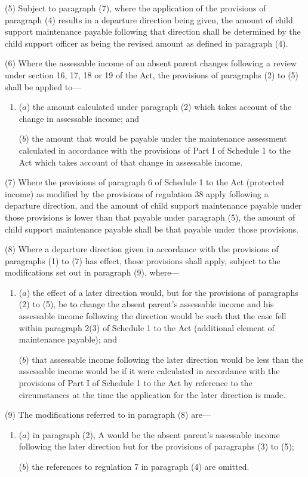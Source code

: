 \documentclass[a4paper]{article}
\begin{document}
(5) Subject to paragraph (7), where the application of the provisions of
paragraph (4) results in a departure direction being given, the amount of child
support maintenance payable following that direction shall be determined by the
child support officer as being the revised amount as defined in paragraph (4).

(6) Where the assessable income of an absent parent changes following a review
under section 16, 17, 18 or 19 of the Act, the provisions of paragraphs (2) to
(5) shall be applied to—
\begin{enumerate}\item[]
($a$) the amount calculated under paragraph (2) which takes account of the change
in assessable income; and

($b$) the amount that would be payable under the maintenance assessment calculated
in accordance with the provisions of Part I of Schedule 1 to the Act which takes
account of that change in assessable income.
\end{enumerate}

(7) Where the provisions of paragraph 6 of Schedule 1 to the Act (protected
income) as modified by the provisions of regulation 38 apply following a
departure direction, and the amount of child support maintenance payable under
those provisions is lower than that payable under paragraph (5), the amount of
child support maintenance payable shall be that payable under those provisions.

(8) Where a departure direction given in accordance with the provisions of
paragraphs (1) to (7) has effect, those provisions shall apply, subject to the
modifications set out in paragraph (9), where—
\begin{enumerate}\item[]
($a$) the effect of a later direction would, but for the provisions of paragraphs
(2) to (5), be to change the absent parent’s assessable income and his
assessable income following the direction would be such that the case fell
within paragraph 2(3) of Schedule 1 to the Act (additional element of
maintenance payable); and

($b$) that assessable income following the later direction would be less than the
assessable income would be if it were calculated in accordance with the
provisions of Part I of Schedule 1 to the Act by reference to the circumstances
at the time the application for the later direction is made.
\end{enumerate}

(9) The modifications referred to in paragraph (8) are—
\begin{enumerate}\item[]
($a$) in paragraph (2), A would be the absent parent’s assessable income following
the later direction but for the provisions of paragraphs (3) to (5);

($b$) the references to regulation 7 in paragraph (4) are omitted.
\end{enumerate}
\end{document}

